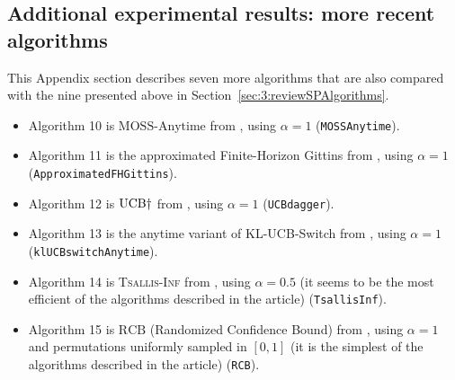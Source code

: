 {%
\begin{small}
    \inputminted[linenos=true,numbersep=5pt,frame=lines,framesep=2mm]{python3}{2-Chapters/3-Chapter/src/example_of_configuration_singleplayer.py}
\end{small}


\subsection{Additional experimental results: more recent algorithms}
\label{sub:3:additionalExperiments}

This Appendix section describes seven more algorithms that are also compared with the nine presented above in Section~\ref{sec:3:reviewSPAlgorithms}.


\begin{itemize}
    \item Algorithm 10 is
    $\mathrm{MOSS}$-$\mathrm{Anytime}$ from \cite{Degenne16}, using $\alpha=1$ (\texttt{MOSSAnytime}).

    \item Algorithm 11 is
    the approximated Finite-Horizon Gittins from \cite{Lattimore16a}, using $\alpha=1$ (\texttt{ApproximatedFHGittins}).

    \item Algorithm 12 is
    $\mathrm{UCB}\dagger$ from \cite{Lattimore2018refining}, using $\alpha=1$ (\texttt{UCBdagger}).

    \item Algorithm 13 is
    the anytime variant of KL-UCB-Switch from \cite{GarivierHadiji2018}, using $\alpha=1$ (\texttt{klUCBswitchAnytime}).

    \item Algorithm 14 is
    \textsc{Tsallis-Inf} from \cite{Zimmert2018}, using $\alpha=0.5$ (it seems to be the most efficient of the algorithms described in the article) (\texttt{TsallisInf}).

    \item Algorithm 15 is
    $\mathrm{RCB}$ (Randomized Confidence Bound) from \cite{KimTewari2019}, using $\alpha=1$ and permutations uniformly sampled in $[0,1]$ (it is the simplest of the algorithms described in the article) (\texttt{RCB}).


\end{itemize}}
